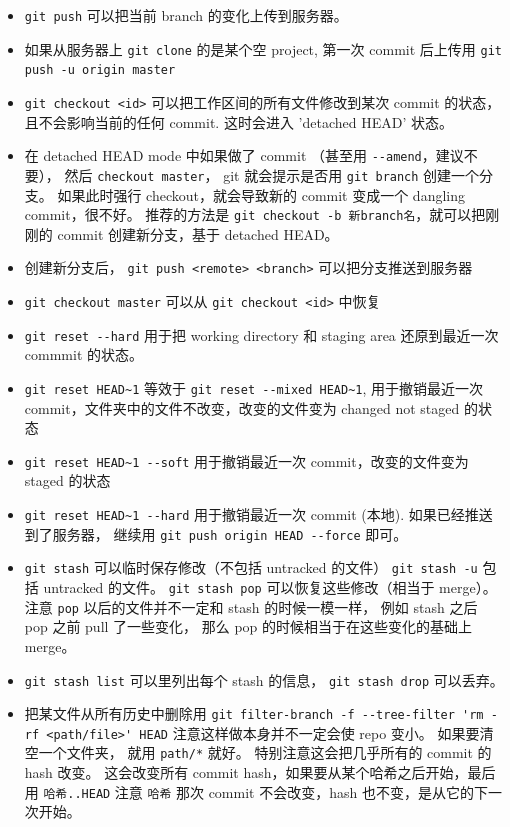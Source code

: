 \begin{itemize}
\item \verb`git push` 可以把当前 branch 的变化上传到服务器。
\item 如果从服务器上 \verb`git clone` 的是某个空 project, 第一次 commit 后上传用 \verb`git push -u origin master`
\item \verb`git checkout <id>` 可以把工作区间的所有文件修改到某次 commit 的状态， 且不会影响当前的任何 commit. 这时会进入 'detached HEAD' 状态。
\item 在 detached HEAD mode 中如果做了 commit （甚至用 \verb`--amend`，建议不要）， 然后 \verb`checkout master`， git 就会提示是否用 \verb`git branch` 创建一个分支。 如果此时强行 checkout，就会导致新的 commit 变成一个 dangling commit，很不好。 推荐的方法是 \verb`git checkout -b 新branch名`，就可以把刚刚的 commit 创建新分支，基于 detached HEAD。
\item 创建新分支后， \verb`git push <remote> <branch>` 可以把分支推送到服务器
\item \verb`git checkout master` 可以从 \verb`git checkout <id>` 中恢复
\item \verb`git reset --hard` 用于把 working directory 和 staging area 还原到最近一次 commmit 的状态。
\item \verb`git reset HEAD~1` 等效于 \verb`git reset --mixed HEAD~1`, 用于撤销最近一次 commit，文件夹中的文件不改变，改变的文件变为 changed not staged 的状态
\item \verb`git reset HEAD~1 --soft` 用于撤销最近一次 commit，改变的文件变为 staged 的状态
\item \verb`git reset HEAD~1 --hard` 用于撤销最近一次 commit (本地). 如果已经推送到了服务器， 继续用 \verb`git push origin HEAD --force` 即可。
\item \verb`git stash` 可以临时保存修改（不包括 untracked 的文件） \verb`git stash -u` 包括 untracked 的文件。 \verb`git stash pop` 可以恢复这些修改（相当于 merge）。 注意 \verb`pop` 以后的文件并不一定和 stash 的时候一模一样， 例如 stash 之后 pop 之前 pull 了一些变化， 那么 pop 的时候相当于在这些变化的基础上 merge。
\item \verb`git stash list` 可以里列出每个 stash 的信息， \verb`git stash drop` 可以丢弃。
\item 把某文件从所有历史中删除用 \verb`git filter-branch -f --tree-filter 'rm -rf <path/file>' HEAD` 注意这样做本身并不一定会使 repo 变小。 如果要清空一个文件夹， 就用 \verb`path/*` 就好。 特别注意这会把几乎所有的 commit 的 hash 改变。 这会改变所有 commit hash，如果要从某个哈希之后开始，最后用 \verb`哈希..HEAD` 注意 \verb`哈希` 那次 commit 不会改变，hash 也不变，是从它的下一次开始。

\end{itemize}
